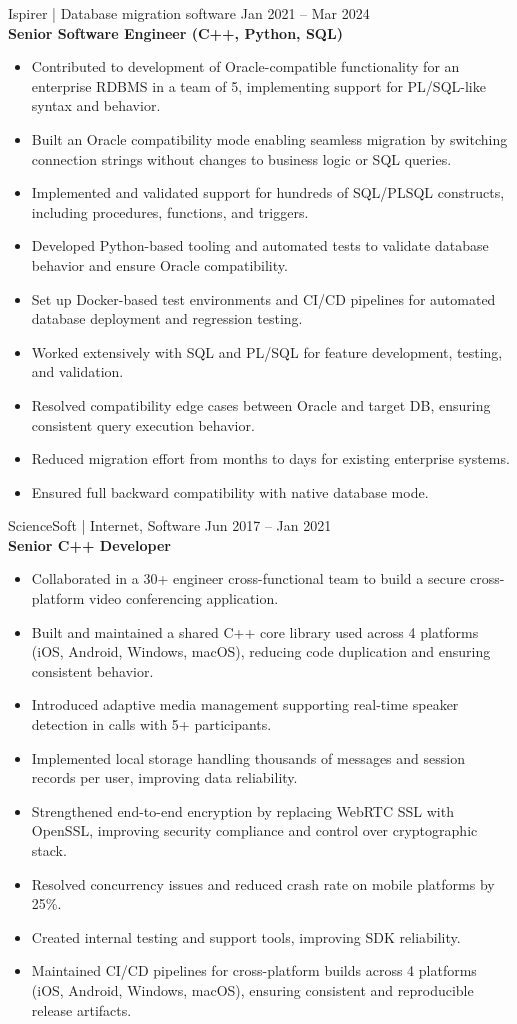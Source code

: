 \documentclass[10pt, a4paper]{article}
\newcommand{\roleentry}[3]{%
    \vspace{8pt}%
    {\normalsize #1 \hfill {\small\color{graytext}#3}}\\[1pt]%
    {\textbf{#2}}%
    \vspace{1pt}%
}
\begin{document}
\roleentry{Ispirer | Database migration software}{Senior Software Engineer (C++, Python, SQL)}{Jan 2021 -- Mar 2024}
\begin{itemize}
    \item Contributed to development of Oracle-compatible functionality for an enterprise RDBMS in a team of 5, implementing support for PL/SQL-like syntax and behavior.
    \item Built an Oracle compatibility mode enabling seamless migration by switching connection strings without changes to business logic or SQL queries.
    \item Implemented and validated support for hundreds of SQL/PLSQL constructs, including procedures, functions, and triggers.
    \item Developed Python-based tooling and automated tests to validate database behavior and ensure Oracle compatibility.
    \item Set up Docker-based test environments and CI/CD pipelines for automated database deployment and regression testing.
    \item Worked extensively with SQL and PL/SQL for feature development, testing, and validation.
    \item Resolved compatibility edge cases between Oracle and target DB, ensuring consistent query execution behavior.
    \item Reduced migration effort from months to days for existing enterprise systems.
    \item Ensured full backward compatibility with native database mode.
\end{itemize}

\roleentry{ScienceSoft | Internet, Software}{Senior C++ Developer}{Jun 2017 -- Jan 2021}
\begin{itemize}
    \item Collaborated in a 30+ engineer cross-functional team to build a secure cross-platform video conferencing application.
    \item Built and maintained a shared C++ core library used across 4 platforms (iOS, Android, Windows, macOS), reducing code duplication and ensuring consistent behavior.
    \item Introduced adaptive media management supporting real-time speaker detection in calls with 5+ participants.
    \item Implemented local storage handling thousands of messages and session records per user, improving data reliability.
    \item Strengthened end-to-end encryption by replacing WebRTC SSL with OpenSSL, improving security compliance and control over cryptographic stack.
    \item Resolved concurrency issues and reduced crash rate on mobile platforms by 25\%.
    \item Created internal testing and support tools, improving SDK reliability.
    \item Maintained CI/CD pipelines for cross-platform builds across 4 platforms (iOS, Android, Windows, macOS), ensuring consistent and reproducible release artifacts.
\end{itemize}
\end{document}
